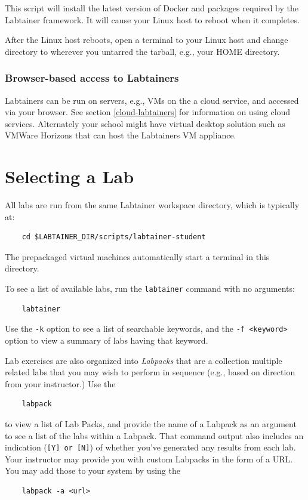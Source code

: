 \documentclass[12pt]{article}
\begin{document}
This script will install the latest version of Docker and packages required
by the Labtainer framework.  It will cause your Linux host to reboot when it
completes.

After the Linux host reboots, open a terminal to your Linux host and
change directory to wherever you untarred the tarball, e.g., your HOME directory.

\subsubsection{Browser-based access to Labtainers}
Labtainers can be run on servers, e.g., VMs on the a cloud service, and accessed
via your browser.   See section \ref{cloud-labtainers} for information on using
cloud services.  Alternately your school might have virtual desktop solution such
as VMWare Horizons that can host the Labtainers VM appliance.

\section{Selecting a Lab}
\label{selecting}
All labs are run from the same Labtainer workspace directory, which is typically at:
\begin{verbatim}
    cd $LABTAINER_DIR/scripts/labtainer-student
\end{verbatim}
\noindent The prepackaged virtual machines automatically start a terminal in this directory.

To see a list of available labs, run the {\tt labtainer} command with no arguments:
\begin{verbatim}
    labtainer 
\end{verbatim}
\noindent Use the {\tt -k} option to see a list of searchable keywords, and the {\tt -f <keyword>} option to view a summary
of labs having that keyword.

Lab exercises are also organized into \textit{Labpacks} that are a collection multiple related labs that you may
wish to perform in sequence (e.g., based on direction from your instructor.)  Use the
\begin{verbatim}
    labpack
\end{verbatim}
\noindent to view a list of Lab Packs, and provide the name of a Labpack as an argument to see a list of the labs
within a Labpack.  That command output also includes an indication ({\tt [Y] or [N]}) of whether you've generated any results from 
each lab.  Your instructor may provide you with custom Labpacks in the form of a URL.  You may add those to your system by
using the 
\begin{verbatim}
    labpack -a <url>
\end{verbatim}
\end{document}
